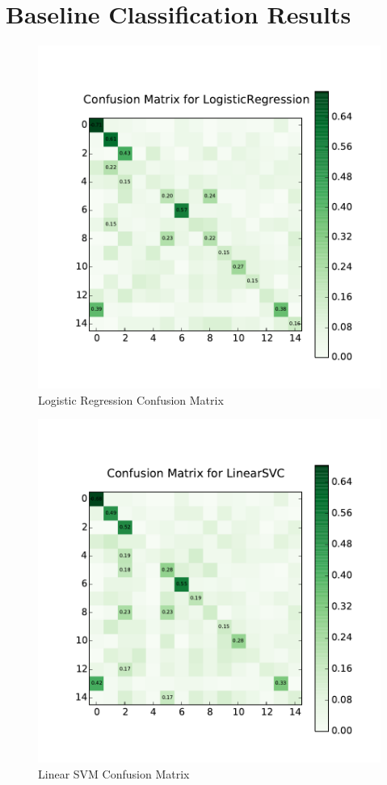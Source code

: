 \section{Baseline Classification Results}
\begin{figure}
\centering
\includegraphics[width=\linewidth]{images/baseline/cm_log_reg.pdf}
\caption{Logistic Regression Confusion Matrix}
\label{log_reg}
\end{figure}
\begin{figure}
\centering
\includegraphics[width=\linewidth]{images/baseline/cm_linear_svm.pdf}
\caption{Linear SVM Confusion Matrix}
\label{linear_svm}
\end{figure}
